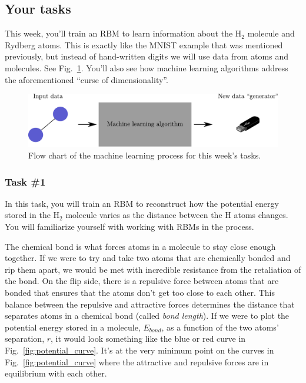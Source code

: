 \documentclass[12pt]{article}
\begin{document}
\subsection*{Your tasks} \label{sec:tasks}

This week, you'll train an RBM to learn information about the H$_2$ molecule and Rydberg atoms. This is exactly like the MNIST example that was mentioned previously, but instead of hand-written digits we will use data from atoms and molecules. See Fig.~\ref{fig:H2_ML}. You'll also see how machine learning algorithms address the aforementioned ``curse of dimensionality''.

\begin{figure}
    \begin{center}
        \includegraphics[width=\linewidth]{../../figures/H2_ML.pdf}
    \end{center}
    \caption{Flow chart of the machine learning process for this week's tasks.}
    \label{fig:H2_ML}
\end{figure}

\subsubsection*{Task \#1}

In this task, you will train an RBM to reconstruct how the potential energy stored in the H$_2$ molecule varies as the distance between the H atoms changes. You will familiarize yourself with working with RBMs in the process. 

The chemical bond is what forces atoms in a molecule to stay close enough together. If we were to try and take two atoms that are chemically bonded and rip them apart, we would be met with incredible resistance from the retaliation of the bond. On the flip side, there is a repulsive force between atoms that are bonded that ensures that the atoms don't get too close to each other. This balance between the repulsive and attractive forces determines the distance that separates atoms in a chemical bond (called \textit{bond length}). If we were to plot the potential energy stored in a molecule, $E_{bond}$, as a function of the two atoms' separation, $r$, it would look something like the blue or red curve in Fig.~\ref{fig:potential_curve}. It's at the very minimum point on the curves in Fig.~\ref{fig:potential_curve} where the attractive and repulsive forces are in equilibrium with each other.
\end{document}
